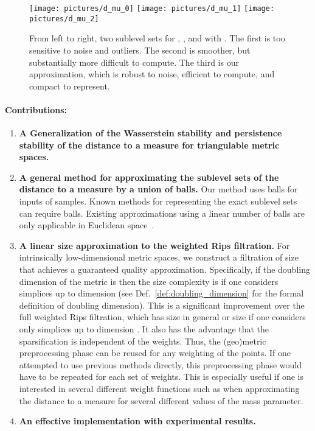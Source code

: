 \documentclass[a4paper]{article}
\begin{document}
  \begin{figure}[htbp]
    \centering
      \texttt{[image: pictures/d\_mu\_0]}
      \texttt{[image: pictures/d\_mu\_1]}
      \texttt{[image: pictures/d\_mu\_2]}
    \caption{From left to right, two sublevel sets for , , and  with .
    The first is too sensitive to noise and outliers.
    The second is smoother, but substantially more difficult to compute.
    The third is our approximation, which is robust to noise, efficient to compute, and compact to represent.}
    \label{fig:d_mu}
  \end{figure}

\paragraph{Contributions:}
\begin{enumerate}
  \item \textbf{A Generalization of the Wasserstein stability and persistence stability of the distance to a measure for triangulable metric spaces.}
  \item \textbf{A general method for approximating the sublevel sets of the distance to a measure by a union of balls.}  
  Our method uses  balls for inputs of  samples.  
  Known methods for representing the exact sublevel sets can require  balls. 
  Existing approximations using a linear number of balls are only applicable in Euclidean space~\cite{wkdGMM}.
\item \textbf{A linear size approximation to the weighted Rips filtration.}
  For intrinsically low-dimensional metric spaces, we construct a filtration of size  that achieves a guaranteed quality approximation.  
  Specifically, if the doubling dimension of the metric is  then the size complexity is  if one considers simplices up to dimension  (see Def.~\ref{def:doubling_dimension} for the formal definition of doubling dimension).
  This is a significant improvement over the full weighted Rips filtration, which has size  in general or size  if one considers only simplices up to dimension .
  It also has the advantage that the sparsification is independent of the weights.
  Thus, the (geo)metric preprocessing phase can be reused for any weighting of the points.
  If one attempted to use previous methods directly, this preprocessing phase would have to be repeated for each set of weights.
  This is especially useful if one is interested in several different weight functions such as when approximating the distance to a measure for several different values of the mass parameter.
  \item \textbf{An effective implementation with experimental results.} 
\end{enumerate}
\end{document}
